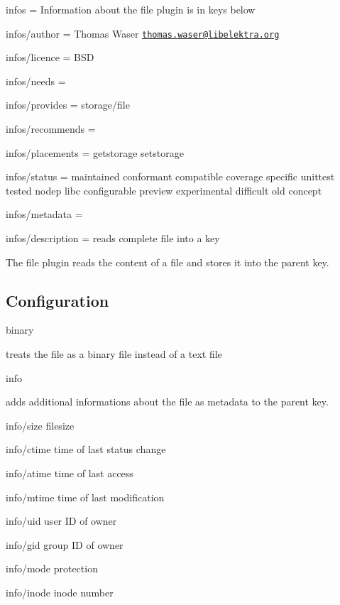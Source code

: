 
\begin{DoxyItemize}
\item infos = Information about the file plugin is in keys below
\item infos/author = Thomas Waser \href{mailto:thomas.waser@libelektra.org}{\tt thomas.\+waser@libelektra.\+org}
\item infos/licence = B\+SD
\item infos/needs =
\item infos/provides = storage/file
\item infos/recommends =
\item infos/placements = getstorage setstorage
\item infos/status = maintained conformant compatible coverage specific unittest tested nodep libc configurable preview experimental difficult old concept
\item infos/metadata =
\item infos/description = reads complete file into a key
\end{DoxyItemize}

The file plugin reads the content of a file and stores it into the parent key.

\subsection*{Configuration}


\begin{DoxyItemize}
\item {\ttfamily binary}

treats the file as a binary file instead of a text file
\item {\ttfamily info}

adds additional informations about the file as metadata to the parent key.
\begin{DoxyItemize}
\item {\ttfamily info/size} filesize
\item {\ttfamily info/ctime} time of last status change
\item {\ttfamily info/atime} time of last access
\item {\ttfamily info/mtime} time of last modification
\item {\ttfamily info/uid} user ID of owner
\item {\ttfamily info/gid} group ID of owner
\item {\ttfamily info/mode} protection
\item {\ttfamily info/inode} inode number
\end{DoxyItemize}
\end{DoxyItemize}

